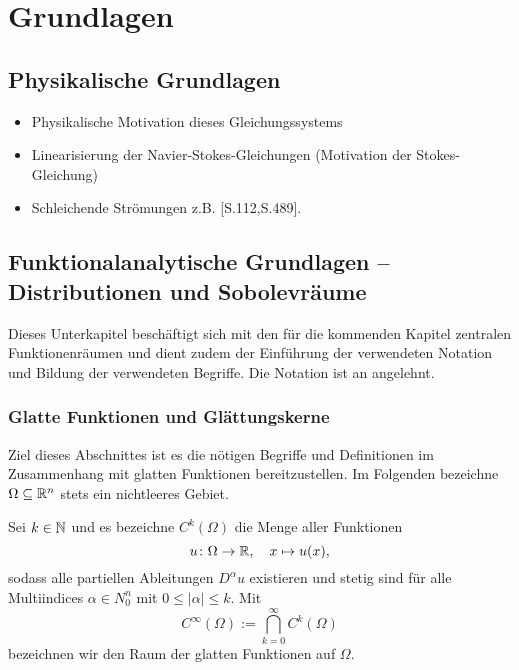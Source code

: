 \chapter{Grundlagen}
\label{cp:grundlagen}

\section{Physikalische Grundlagen}

\begin{itemize}
  \item Physikalische Motivation dieses Gleichungssystems
  \item Linearisierung der Navier-Stokes-Gleichungen (Motivation der Stokes-Gleichung)
  \item Schleichende Strömungen z.B. \cite{spurk10stroemungslehre}[S.112,S.489]. 
\end{itemize}

\section{Funktionalanalytische Grundlagen -- Distributionen und Sobolevräume}

Dieses Unterkapitel beschäftigt sich mit den für die kommenden Kapitel zentralen Funktionenräumen und dient zudem der Einführung der verwendeten Notation und Bildung der verwendeten Begriffe.
Die Notation ist an \cite{sohr2001navier} angelehnt.

\subsection{Glatte Funktionen und Glättungskerne}
\label{subsec:smoothMolly}

Ziel dieses Abschnittes ist es die nötigen Begriffe und Definitionen im Zusammenhang mit glatten Funktionen bereitzustellen.
Im Folgenden bezeichne $\Omega \subseteq \mathbb{R}^n$ stets ein nichtleeres Gebiet.

Sei $k \in \mathbb{N}$ und es bezeichne $C^k(\Omega)$ die Menge aller Funktionen
$$
u \colon \Omega \to \mathbb{R}, \quad x \mapsto u(x),
$$
sodass alle partiellen Ableitungen $D^\alpha u$ existieren und stetig sind für alle Multiindices $\alpha \in N_0^n$ mit $0 \leq |\alpha| \leq k$. Mit
$$
  C^\infty(\Omega) := \bigcap_{k = 0}^\infty C^k(\Omega)
$$
bezeichnen wir den Raum der glatten Funktionen auf $\Omega$.

